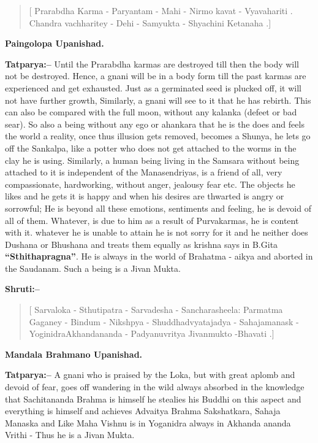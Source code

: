 \begin{verse}
[ Prarabdha Karma - Paryantam - Mahi - Nirmo kavat - Vyavahariti . Chandra vachharitey - Dehi - Samyukta - Shyachini Ketanaha .]
\end{verse}

\begin{flushright}
\textbf{Paingolopa Upanishad.}
\end{flushright}

\textbf{Tatparya:–} Until the Prarabdha karmas are destroyed till then the body will not be destroyed. Hence, a gnani will be in a body form till the past karmas are experienced and get exhausted. Just as a germinated seed is plucked off, it will not have further growth, Similarly, a gnani will see to it that he has rebirth. This can also be compared with the full moon, without any kalanka (defeet or bad sear). So also a being without any ego or ahankara that he is the does and feels the world a reality, once thus illusion gets removed, becomes a Shunya, he lets go off the Sankalpa, like a potter who does not get attached to the worms in the clay he is using. Similarly, a human being living in the Samsara without being attached to it is independent of the Manasendriyas, is a friend of all, very compassionate, hardworking, without anger, jealousy fear etc. The objects he likes and he gets it is happy and when his desires are thwarted is angry or sorrowful; He is beyond all these emotions, sentiments and feeling, he is devoid of all of them. Whatever, is due to him as a result of Purvakarmas, he is content with it. whatever he is unable to attain he is not sorry for it and he neither does Dushana or Bhushana and treats them equally as krishna says in B.Gita \textbf{“Sthithapragna”}. He is always in the world of Brahatma - aikya and aborted in the Saudanam. Such a being is a Jivan Mukta.

\textbf{Shruti:–}

\begin{verse}
[ Sarvaloka - Sthutipatra - Sarvadesha - Sanchara\break sheela:  Parmatma Gaganey - Bindum - Nikshpya - Shuddhadvyatajadya - Sahajamanask - Yoginidra\break Akhandananda - Padyanuvritya Jivanmukto -\break Bhavati .]
\end{verse}

\begin{flushright}
\textbf{Mandala Brahmano Upanishad.}
\end{flushright}

\textbf{Tatparya:–} A gnani who is praised by the Loka, but with great aplomb and devoid of fear, goes off wandering in the wild always absorbed in the knowledge that Sachitananda Brahma is himself he stealies his Buddhi on this aspect and everything is himself and achieves Advaitya Brahma Sakshatkara, Sahaja Manaska and Like Maha Vishnu is in Yoganidra always in Akhanda ananda Vrithi - Thus he is a Jivan Mukta.

